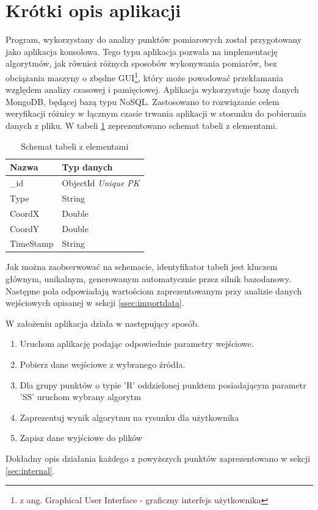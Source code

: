 \section{Krótki opis aplikacji}
\label{sec:shortdesc}
Program, wykorzystany do analizy punktów pomiarowych został przygotowany jako aplikacja konsolowa. Tego typu aplikacja pozwala na implementację algorytmów, jak również różnych sposobów wykonywania pomiarów, bez obciążania maszyny o zbędne GUI\footnote{z ang. Graphical User Interface - graficzny interfejs użytkownika}, który może powodować przekłamania względem analizy czasowej i pamięciowej. Aplikacja wykorzystuje bazę danych MongoDB, będącej bazą typu NoSQL. Zastosowano to rozwiązanie celem weryfikacji różnicy w łącznym czasie trwania aplikacji w stosunku do pobierania danych z pliku. W tabeli \ref{tab:nosqlschema} zeprezentowano schemat tabeli z elementami.
\begin{table}[H]
    \centering
    \begin{tabular}{|l|l|}
    \hline
    \textbf{Nazwa} & \textbf{Typ danych} \\ \hline
    \_id           & ObjectId \textit{Unique PK} \\ \hline
    Type           & String              \\ \hline
    CoordX         & Double              \\ \hline
    CoordY         & Double              \\ \hline
    TimeStamp      & String              \\ \hline
    \end{tabular}
    \caption{Schemat tabeli z elementami}
    \label{tab:nosqlschema}
\end{table}
Jak można zaobserwować na schemacie, identyfikator tabeli jest kluczem głównym, unikalnym, generowanym automatycznie przez silnik bazodanowy. Następne pola odpowiadają wartościom zaprezentowanym przy analizie danych wejściowych opisanej w sekcji \ref{ssec:importdata}.\par
W założeniu aplikacja działa w następujący sposób.
\begin{enumerate}
        \item Uruchom aplikację podając odpowiednie parametry wejściowe.
        \item Pobierz dane wejściowe z wybranego źródła.
        \item Dla grupy punktów o typie 'R' oddzielonej punktem posiadającym parametr 'SS' uruchom wybrany algorytm
        \item Zaprezentuj wynik algorytmu na rysunku dla użytkownika
        \item Zapisz dane wyjściowe do plików
\end{enumerate}
Dokładny opis działania każdego z powyższych punktów zaprezentowano w sekcji \ref{sec:internal}.
